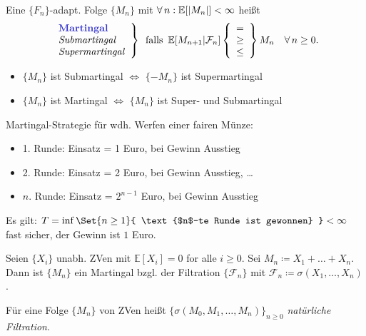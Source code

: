 \documentclass{cheat-sheet}
\newcommand{\E}{\mathbb{E}} %
\newcommand{\Filt}{\mathcal{F}} %
\begin{document}
\begin{defn}
  Eine $\{ F_n \}$-adapt. Folge $\{ M_n \}$ mit $\fa{n\!}\! \E[\abs{M_n}] < \infty$ heißt
  \[
    \left. \begin{array}{l}
      \text{\emph{Martingal}}\\
      \text{\textit{Submartingal}}\\
      \text{\textit{Supermartingal}}\\
    \end{array} \right\}
    \enspace \text{falls} \enspace
    \E[M_{n+1} | \Filt_n]
    \left\{ \begin{array}{l}
      =\\
      \geq\\
      \leq
    \end{array} \right\}
    M_n
    \quad \forall\,n \geq 0.
  \]
\end{defn}

\begin{bem}
  \begin{itemize}
    \item $\{ M_n \}$ ist Submartingal $\iff$ $\{ -M_n \}$ ist Supermartingal
    \item $\{ M_n \}$ ist Martingal $\iff$ $\{ M_n \}$ ist Super- und Submartingal
  \end{itemize}
\end{bem}

\begin{bem}
  Martingal-Strategie für wdh. Werfen einer fairen Münze:
  \begin{itemize}
    \item 1. Runde: Einsatz = 1 Euro, bei Gewinn Ausstieg
    \item 2. Runde: Einsatz = 2 Euro, bei Gewinn Ausstieg, \ldots
    \item $n$. Runde: Einsatz = $2^{n-1}$ Euro, bei Gewinn Ausstieg
  \end{itemize}
  Es gilt: $T = \inf \Set{ n \geq 1 }{ \text{$n$-te Runde ist gewonnen} } < \infty$ fast sicher, der Gewinn ist $1$ Euro.
\end{bem}

\begin{bsp}
  Seien $\{ X_i \}$ unabh. ZVen mit $\E[X_i] = 0$ for alle $i \geq 0$.
  Sei $M_n \coloneqq X_1 + \ldots + X_n$.
  Dann ist $\{ M_n \}$ ein Martingal bzgl. der Filtration $\{ \Filt_n \}$ mit $\Filt_n \coloneqq \sigma(X_1, \ldots, X_n)$.
\end{bsp}

\begin{defn}
  Für eine Folge $\{ M_n \}$ von ZVen heißt $\{ \sigma(M_0, M_1, \ldots, M_n) \}_{n \geq 0}$ \emph{natürliche Filtration}.
\end{defn}
\end{document}
